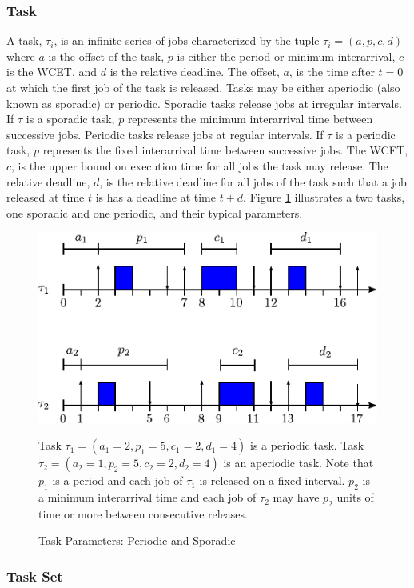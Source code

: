 \subsubsection{Task}

A task, $\tau_i$, is an infinite series of jobs characterized by the tuple $\tau_i = (a,p,c,d)$ where $a$ is the offset of the task, $p$ is either the period or minimum interarrival, $c$ is the WCET, and $d$ is the relative deadline.
The offset, $a$, is the time after $t=0$ at which the first job of the task is released.
Tasks may be either aperiodic (also known as sporadic) or periodic.
Sporadic tasks release jobs at irregular intervals.
If $\tau$ is a sporadic task, $p$ represents the minimum interarrival time between successive jobs.
Periodic tasks release jobs at regular intervals.
If $\tau$ is a periodic task, $p$ represents the fixed interarrival time between successive jobs.
The WCET, $c$, is the upper bound on execution time for all jobs the task may release.
The relative deadline, $d$, is the relative deadline for all jobs of the task such that a job released at time $t$ is has a deadline at time $t+d$.
Figure \ref{fig:rt-task} illustrates a two tasks, one sporadic and one periodic, and their typical parameters.

\begin{figure}
    \centering
    \includegraphics[width=0.75\linewidth]{fig/taskParameters.pdf}
    \caption{Task Parameters: Periodic and Sporadic} Task $\tau_1 = (a_1=2, p_1 = 5, c_1=2, d_1=4)$ is a periodic task.
    Task $\tau_2 = (a_2=1,p_2=5,c_2=2,d_2=4)$ is an aperiodic task.
    Note that $p_1$ is a period and each job of $\tau_1$ is released on a fixed interval.
    $p_2$ is a minimum interarrival time and each job of $\tau_2$ may have $p_2$ units of time or more between consecutive releases.
    \label{fig:rt-task}
\end{figure}

\subsubsection{Task Set}

